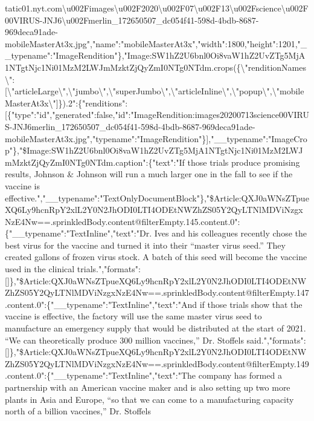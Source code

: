 tatic01.nyt.com\textbackslash{}u002Fimages\textbackslash{}u002F2020\textbackslash{}u002F07\textbackslash{}u002F13\textbackslash{}u002Fscience\textbackslash{}u002F00VIRUS-JNJ6\textbackslash{}u002Fmerlin\_172650507\_dc054f41-598d-4bdb-8687-969deca91ade-mobileMasterAt3x.jpg","name":"mobileMasterAt3x","width":1800,"height":1201,"\_\_typename":"ImageRendition"\},"Image:SW1hZ2U6bnl0Oi8vaW1hZ2UvZTg5MjA1NTgtNjc1Ni01MzM2LWJmMzktZjQyZmI0NTg0NTdm.crops(\{\textbackslash{}"renditionNames\textbackslash{}":{[}\textbackslash{}"articleLarge\textbackslash{}",\textbackslash{}"jumbo\textbackslash{}",\textbackslash{}"superJumbo\textbackslash{}",\textbackslash{}"articleInline\textbackslash{}",\textbackslash{}"popup\textbackslash{}",\textbackslash{}"mobileMasterAt3x\textbackslash{}"{]}\}).2":\{"renditions":{[}\{"type":"id","generated":false,"id":"ImageRendition:images20200713science00VIRUS-JNJ6merlin\_172650507\_dc054f41-598d-4bdb-8687-969deca91ade-mobileMasterAt3x.jpg","typename":"ImageRendition"\}{]},"\_\_typename":"ImageCrop"\},"\$Image:SW1hZ2U6bnl0Oi8vaW1hZ2UvZTg5MjA1NTgtNjc1Ni01MzM2LWJmMzktZjQyZmI0NTg0NTdm.caption":\{"text":"If
those trials produce promising results, Johnson \& Johnson will run a
much larger one in the fall to see if the vaccine is
effective.","\_\_typename":"TextOnlyDocumentBlock"\},"\$Article:QXJ0aWNsZTpueXQ6Ly9hcnRpY2xlL2Y0N2JhODI0LTI4ODEtNWZhZS05Y2QyLTNlMDViNzgxNzE4Nw==.sprinkledBody.content@filterEmpty.145.content.0":\{"\_\_typename":"TextInline","text":"Dr.
Ives and his colleagues recently chose the best virus for the vaccine
and turned it into their ``master virus seed.'' They created gallons of
frozen virus stock. A batch of this seed will become the vaccine used in
the clinical
trials.","formats":{[}{]}\},"\$Article:QXJ0aWNsZTpueXQ6Ly9hcnRpY2xlL2Y0N2JhODI0LTI4ODEtNWZhZS05Y2QyLTNlMDViNzgxNzE4Nw==.sprinkledBody.content@filterEmpty.147.content.0":\{"\_\_typename":"TextInline","text":"And
if those trials show that the vaccine is effective, the factory will use
the same master virus seed to manufacture an emergency supply that would
be distributed at the start of 2021. ``We can theoretically produce 300
million vaccines,'' Dr. Stoffels
said.","formats":{[}{]}\},"\$Article:QXJ0aWNsZTpueXQ6Ly9hcnRpY2xlL2Y0N2JhODI0LTI4ODEtNWZhZS05Y2QyLTNlMDViNzgxNzE4Nw==.sprinkledBody.content@filterEmpty.149.content.0":\{"\_\_typename":"TextInline","text":"The
company has formed a partnership with an American vaccine maker and is
also setting up two more plants in Asia and Europe, ``so that we can
come to a manufacturing capacity north of a billion vaccines,'' Dr.
Stoffels
